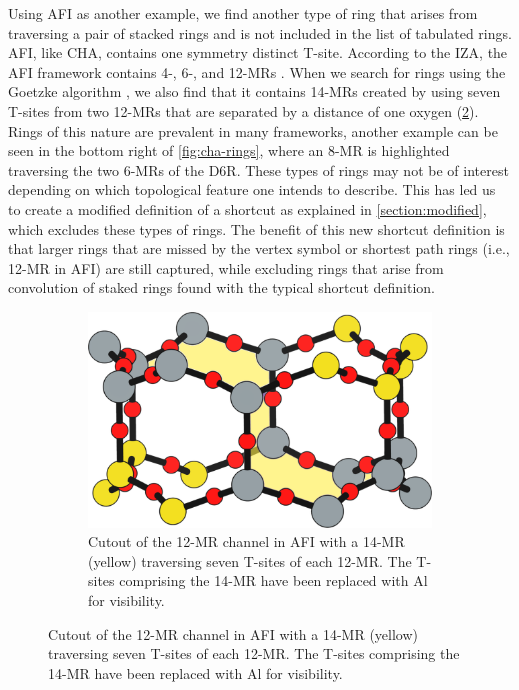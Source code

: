 \documentclass[preprint,numrefs,noinfo,sort&compress]{elsarticle}
\begin{document}
Using AFI as another example, we find another type of ring that arises from traversing a pair of stacked rings and is not included in the list of tabulated rings. AFI, like CHA, contains one symmetry distinct T-site. According to the IZA, the AFI framework contains 4-, 6-, and 12-MRs \cite{baerlocher-database-nodate}. When we search for rings using the Goetzke algorithm \cite{goetzke-properties-1991}, we also find that it contains 14-MRs created by using seven T-sites from two 12-MRs that are separated by a distance of one oxygen (\cref{fig:afi-14}). Rings of this nature are prevalent in many frameworks, another example can be seen in the bottom right of \cref{fig:cha-rings}, where an 8-MR is highlighted traversing the two 6-MRs of the D6R. These types of rings may not be of interest depending on which topological feature one intends to describe. This has led us to create a modified definition of a shortcut as explained in \cref{section:modified}, which excludes these types of rings. The benefit of this new shortcut definition is that larger rings that are missed by the vertex symbol or shortest path rings (i.e., 12-MR in AFI) are still captured, while excluding rings that arise from convolution of staked rings found with the typical shortcut definition.

\begin{figure}
\begin{figure}[H]
\centering
\includegraphics[width=\textwidth]{figures/chapter-3/afi-14.pdf}
\caption{Cutout of the 12-MR channel in AFI with a 14-MR (yellow) traversing seven T-sites of each 12-MR. The T-sites comprising the 14-MR have been replaced with Al for visibility. \label{fig:afi-14}}
\end{figure}
\end{figure}
\end{document}
